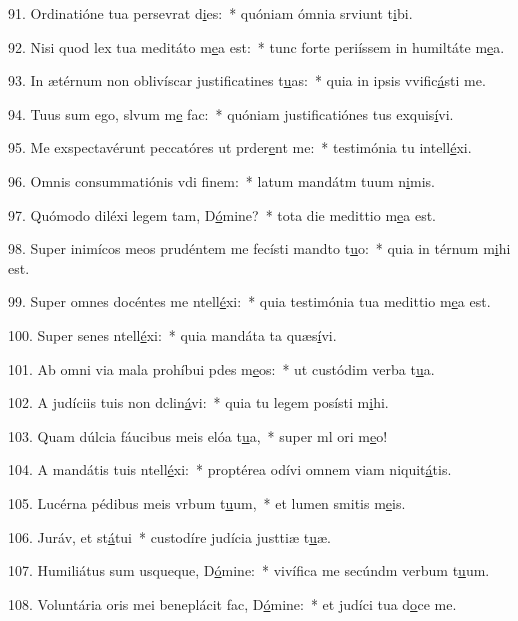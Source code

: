 91. Ordinatióne tua persevrat d\uline{i}es:~* quóniam ómnia srviunt t\uline{i}bi.\par 
92. Nisi quod lex tua meditáto m\uline{e}a est:~* tunc forte periíssem in humiltáte m\uline{e}a.\par 
93. In ætérnum non oblivíscar justificatines t\uline{u}as:~* quia in ipsis vvific\uline{á}sti me.\par 
94. Tuus sum ego, slvum m\uline{e} fac:~* quóniam justificatiónes tus exquis\uline{í}vi.\par 
95. Me exspectavérunt peccatóres ut prder\uline{e}nt me:~* testimónia tu intell\uline{é}xi.\par 
96. Omnis consummatiónis vdi f\uline{i}nem:~* latum mandátm tuum n\uline{i}mis.\par 
97. Quómodo diléxi legem tam, D\uline{ó}mine?~* tota die medittio m\uline{e}a est.\par 
98. Super inimícos meos prudéntem me fecísti mandto t\uline{u}o:~* quia in térnum m\uline{i}hi est.\par 
99. Super omnes docéntes me ntell\uline{é}xi:~* quia testimónia tua medittio m\uline{e}a est.\par 
100. Super senes ntell\uline{é}xi:~* quia mandáta ta quæs\uline{í}vi.\par 
101. Ab omni via mala prohíbui pdes m\uline{e}os:~* ut custódim verba t\uline{u}a.\par 
102. A judíciis tuis non dclin\uline{á}vi:~* quia tu legem posísti m\uline{i}hi.\par 
103. Quam dúlcia fáucibus meis elóa t\uline{u}a,~* super ml ori m\uline{e}o!\par 
104. A mandátis tuis ntell\uline{é}xi:~* proptérea odívi omnem viam niquit\uline{á}tis.\par 
105. Lucérna pédibus meis vrbum t\uline{u}um,~* et lumen smitis m\uline{e}is.\par 
106. Juráv, et st\uline{á}tui~* custodíre judícia justtiæ t\uline{u}æ.\par 
107. Humiliátus sum usqueque, D\uline{ó}mine:~* vivífica me secúndm verbum t\uline{u}um.\par 
108. Voluntária oris mei beneplácit fac, D\uline{ó}mine:~* et judíci tua d\uline{o}ce me.\par 
